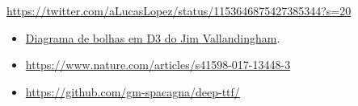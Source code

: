 \documentclass[
]{book}
\begin{document}
\url{https://twitter.com/aLucasLopez/status/1153646875427385344?s=20}

\begin{itemize}
\item
  \href{https://vallandingham.me/bubble_charts_with_d3v4.html}{Diagrama de bolhas em D3 do Jim Vallandingham}.
\item
  \url{https://www.nature.com/articles/s41598-017-13448-3}
\item
  \url{https://github.com/gm-spacagna/deep-ttf/}
\end{itemize}

\backmatter
  
\end{document}
